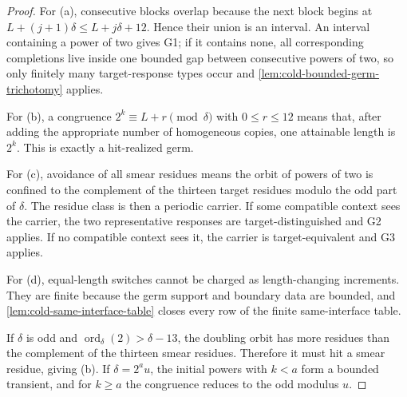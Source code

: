\documentclass[11pt]{article}
\begin{document}
\begin{proof}
For (a), consecutive blocks overlap because the next block begins at
\(L+(j+1)\delta\le L+j\delta+12\).  Hence their union is an interval.  An
interval containing a power of two gives G1; if it contains none, all
corresponding completions live inside one bounded gap between consecutive
powers of two, so only finitely many target-response types occur and
\cref{lem:cold-bounded-germ-trichotomy} applies.

For (b), a congruence \(2^k\equiv L+r\pmod\delta\) with \(0\le r\le12\) means
that, after adding the appropriate number of homogeneous copies, one attainable
length is \(2^k\).  This is exactly a hit-realized germ.

For (c), avoidance of all smear residues means the orbit of powers of two is
confined to the complement of the thirteen target residues modulo the odd
part of \(\delta\).  The residue class is then a periodic carrier.  If some
compatible context sees the carrier, the two representative responses are
target-distinguished and G2 applies.  If no compatible context sees it, the
carrier is target-equivalent and G3 applies.

For (d), equal-length switches cannot be charged as length-changing
increments.  They are finite because the germ support and boundary data are
bounded, and \cref{lem:cold-same-interface-table} closes every row of the
finite same-interface table.

If \(\delta\) is odd and \(\operatorname{ord}_{\delta}(2)>\delta-13\), the
doubling orbit has more residues than the complement of the thirteen smear
residues.  Therefore it must hit a smear residue, giving (b).  If
\(\delta=2^a u\), the initial powers with \(k<a\) form a bounded transient, and
for \(k\ge a\) the congruence reduces to the odd modulus \(u\).
\end{proof}
\end{document}
